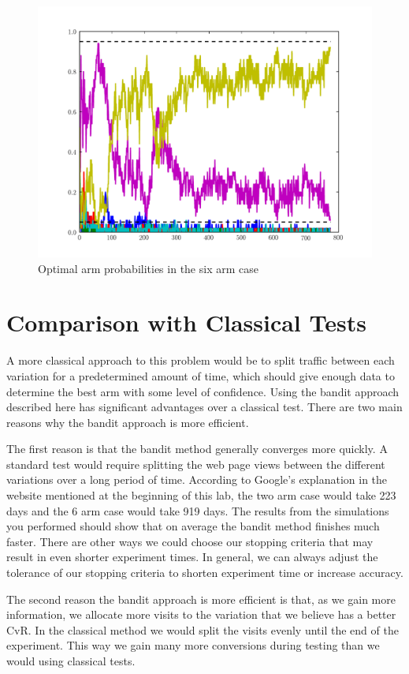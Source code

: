\begin{figure}
\begin{center}
        \includegraphics[width=\textwidth]{./Applications/MarkDecProc/weights2.pdf}
        \caption{Optimal arm probabilities in the six arm case}
				\label{fig:weights2}
\end{center}
\end{figure}

\section*{Comparison with Classical Tests}
A more classical approach to this problem would be to split traffic between each variation for a predetermined amount of time, which should give enough data to determine the best arm with some level of confidence.  Using the bandit approach described here has significant advantages over a classical test.  There are two main reasons why the bandit approach is more efficient.

The first reason is that the bandit method generally converges more quickly.  A standard test would require splitting the web page views between the different variations over a long period of time.  According to Google's explanation in the website mentioned at the beginning of this lab, the two arm case would take 223 days and the 6 arm case would take 919 days.  The results from the simulations you performed should show that on average the bandit method finishes much faster.  There are other ways we could choose our stopping criteria that may result in even shorter experiment times.  In general, we can always adjust the tolerance of our stopping criteria to shorten experiment time or increase accuracy.

The second reason the bandit approach is more efficient is that, as we gain more information, we allocate more visits to the variation that we believe has a better CvR.  In the classical method we would split the visits evenly until the end of the experiment.  This way we gain many more conversions during testing than we would using classical tests.

